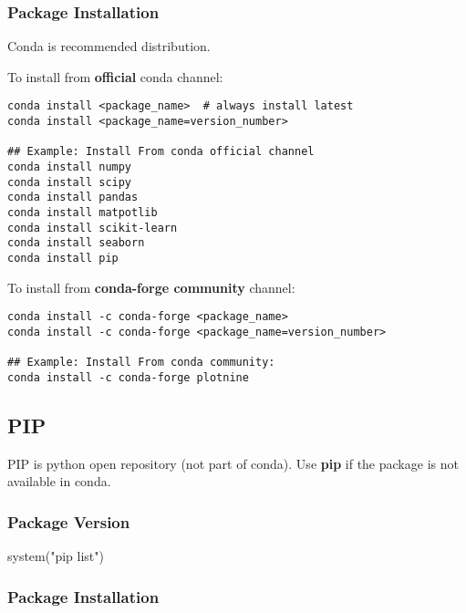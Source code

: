 \documentclass[
]{book}
\newenvironment{Shaded}{\begin{snugshade}}{\end{snugshade}}
\newcommand{\FunctionTok}[1]{\textcolor[rgb]{0,0,0}{#1}}
\newcommand{\NormalTok}[1]{#1}
\newcommand{\StringTok}[1]{\textcolor[rgb]{0.5,0.5,0.5}{#1}}
\begin{document}
\hypertarget{package-installation}{%
\subsubsection{Package Installation}\label{package-installation}}

Conda is recommended distribution.

To install from \textbf{official} conda channel:

\begin{verbatim}
conda install <package_name>  # always install latest
conda install <package_name=version_number>

## Example: Install From conda official channel
conda install numpy
conda install scipy
conda install pandas
conda install matpotlib
conda install scikit-learn
conda install seaborn
conda install pip
\end{verbatim}

To install from \textbf{conda-forge community} channel:

\begin{verbatim}
conda install -c conda-forge <package_name>
conda install -c conda-forge <package_name=version_number>

## Example: Install From conda community:
conda install -c conda-forge plotnine
\end{verbatim}

\hypertarget{pip}{%
\subsection{PIP}\label{pip}}

PIP is python open repository (not part of conda). Use \textbf{pip} if the package is not available in conda.

\hypertarget{package-version-1}{%
\subsubsection{Package Version}\label{package-version-1}}

\begin{Shaded}
\begin{Highlighting}[]
\FunctionTok{system}\NormalTok{(}\StringTok{"pip list"}\NormalTok{)}
\end{Highlighting}
\end{Shaded}

\hypertarget{package-installation-1}{%
\subsubsection{Package Installation}\label{package-installation-1}}
\end{document}
